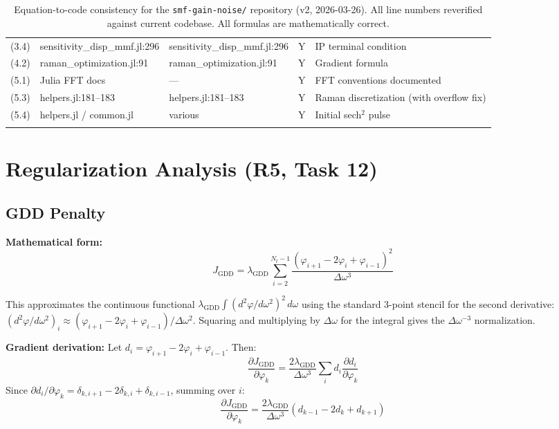 \documentclass[12pt,a4paper]{article}
\newcommand{\pdv}[2]{\frac{\partial #1}{\partial #2}}
\theoremstyle{definition}
\begin{document}
{\begin{longtable}{p{1.6cm}p{3.5cm}p{3.5cm}p{0.7cm}p{3.5cm}}
(3.4) & sensitivity\_disp\_mmf.jl:296 & sensitivity\_disp\_mmf.jl:296 & Y & IP terminal condition \\

(4.2) & raman\_optimization.jl:91 & raman\_optimization.jl:91 & Y & Gradient formula \\

(5.1) & Julia FFT docs & --- & Y & FFT conventions documented \\

(5.3) & helpers.jl:181--183 & helpers.jl:181--183 & Y & Raman discretization (with overflow fix) \\

(5.4) & helpers.jl / common.jl & various & Y & Initial sech$^2$ pulse \\

\bottomrule

\caption{Equation-to-code consistency for the \texttt{smf-gain-noise/} repository (v2, 2026-03-26). All line numbers reverified against current codebase. All formulas are mathematically correct.}
\end{longtable}
}


\section{Regularization Analysis (R5, Task 12)}
\label{sec:regularization}

\subsection{GDD Penalty}

\textbf{Mathematical form:}
\begin{equation}
J_{\text{GDD}} = \lambda_{\text{GDD}} \sum_{i=2}^{N_t-1} \frac{(\varphi_{i+1} - 2\varphi_i + \varphi_{i-1})^2}{\Delta\omega^3}
\label{eq:gdd_penalty}
\end{equation}

This approximates the continuous functional $\lambda_{\text{GDD}}\int (d^2\varphi/d\omega^2)^2\,d\omega$ using the standard 3-point stencil for the second derivative: $(d^2\varphi/d\omega^2)_i \approx (\varphi_{i+1} - 2\varphi_i + \varphi_{i-1})/\Delta\omega^2$. Squaring and multiplying by $\Delta\omega$ for the integral gives the $\Delta\omega^{-3}$ normalization.

\textbf{Gradient derivation:} Let $d_i = \varphi_{i+1} - 2\varphi_i + \varphi_{i-1}$. Then:
\begin{equation}
\pdv{J_{\text{GDD}}}{\varphi_k} = \frac{2\lambda_{\text{GDD}}}{\Delta\omega^3}\sum_i d_i \pdv{d_i}{\varphi_k}
\end{equation}
Since $\partial d_i/\partial\varphi_k = \delta_{k,i+1} - 2\delta_{k,i} + \delta_{k,i-1}$, summing over $i$:
\begin{equation}
\pdv{J_{\text{GDD}}}{\varphi_k} = \frac{2\lambda_{\text{GDD}}}{\Delta\omega^3}(d_{k-1} - 2d_k + d_{k+1})
\end{equation}
\end{document}
